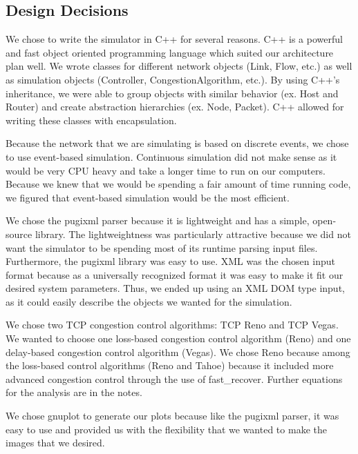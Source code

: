 \documentclass{article}
\begin{document}
\subsection{Design Decisions}
    We chose to write the simulator in C++ for several reasons. C++ is a powerful and fast object oriented programming language which suited our architecture plan well. We wrote classes for different network objects (Link, Flow, etc.) as well as simulation objects (Controller, CongestionAlgorithm, etc.). By using C++’s inheritance, we were able to group objects with similar behavior (ex. Host and Router) and create abstraction hierarchies (ex. Node, Packet).  C++ allowed for writing these classes with encapsulation.

    Because the network that we are simulating is based on discrete events, we chose to use event-based simulation. Continuous simulation did not make sense as it would be very CPU heavy and take a longer time to run on our computers. Because we knew that we would be spending a fair amount of time running code, we figured that event-based simulation would be the most efficient.

    We chose the pugixml parser because it is lightweight and has a simple, open-source library. The lightweightness was particularly attractive because we did not want the simulator to be spending most of its runtime parsing input files. Furthermore, the pugixml library was easy to use. XML was the chosen input format because as a universally recognized format it was easy to make it fit our desired system parameters. Thus, we ended up using an XML DOM type input, as it could easily describe the objects we wanted for the simulation.

    We chose two TCP congestion control algorithms: TCP Reno and TCP Vegas. We wanted to choose one loss-based congestion control algorithm (Reno) and one delay-based congestion control algorithm (Vegas). We chose Reno because among the loss-based control algorithms (Reno and Tahoe) because it included more advanced congestion control through the use of fast\_recover. Further equations for the analysis are in the notes. 
    
    We chose gnuplot to generate our plots because like the pugixml parser, it was easy to use and provided us with the flexibility that we wanted to make the images that we desired. 











\end{document}
